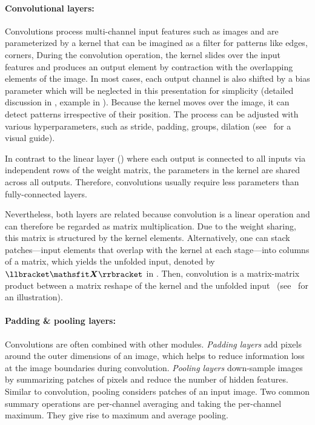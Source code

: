 \paragraph{Convolutional layers:} Convolutions process multi-channel input
features such as images and are parameterized by a kernel that can be imagined
as a filter for patterns like edges, corners, \etc During the convolution
operation, the kernel slides over the input features and produces an output
element by contraction with the overlapping elements of the image. In most
cases, each output channel is also shifted by a bias parameter which will be
neglected in this presentation for simplicity (detailed discussion in
, example in ).
Because the kernel moves over the image, it can detect patterns irrespective of
their position. The process can be adjusted with various hyperparameters, such
as stride, padding, groups, dilation
(see~\cite{dumoulin2016ConvolutionArithmeticGuide} for a visual guide).

In contrast to the linear layer () where each
output is connected to all inputs via independent rows of the weight matrix, the
parameters in the kernel are shared across all outputs. Therefore, convolutions
usually require less parameters than fully-connected layers.

Nevertheless, both layers are related because convolution is a linear operation
and can therefore be regarded as matrix multiplication. Due to the weight
sharing, this matrix is structured by the kernel elements. Alternatively, one can stack patches---input
elements that overlap with the kernel at each stage---into columns of a matrix,
which yields the unfolded input, denoted by $\llbracket \tX \rrbracket$ in
. Then, convolution is a matrix-matrix product
between a matrix reshape of the kernel and the unfolded
input~\cite{chellapilla2006HighPerformanceCNN}
(see~ for an illustration).

\paragraph{Padding \& pooling layers:} Convolutions are often combined with
other modules. \emph{Padding layers} add pixels around the outer dimensions of
an image, which helps to reduce information loss at the image boundaries during
convolution. \emph{Pooling layers} down-sample images by summarizing patches of
pixels and reduce the number of hidden features. Similar to convolution, pooling
considers patches of an input image. Two common summary operations are
per-channel averaging and taking the per-channel maximum. They give rise to
maximum and average pooling.

